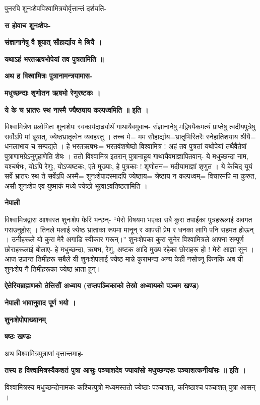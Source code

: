 \documentclass[11pt, a5paper]{article}
\begin{document}
पुनरपि शुनःशेपविश्वामित्रयोर्वृत्तान्तं दर्शयति-

\textbf{स होवाच शुनःशेपः-}

\textbf{संज्ञानानेषु वै ब्रूयात् सौहार्द्याय मे श्रियै ।}

\textbf{यथाऽहं भरतऋषभोपेयां तव पुत्रतामिति ॥}

\textbf{अथ ह विश्वामित्रः पुत्रानामन्त्रयामास-}

\textbf{मधुच्छन्दाः शृणोतन ऋषभो रेणुरष्टकः ।}

\textbf{ये के च भ्रातरः स्थ नास्मै ज्यैष्ठ्याय कल्पध्वमिति ॥ इति ।}

विश्वामित्रेण प्रलोभितः शुनःशेपः स्वकार्यदार्ढ्यार्थं गाथायैवमुवाच- संज्ञानानेषु मद्विषयैकमत्यं प्राप्तेषु त्वदीयपुत्रेषु सर्वोऽपि मां ब्रूयात्, ज्येष्ठभ्रातृत्वेन व्यवहरतु । तच्च मे= मम सौहार्द्याय=भ्रातृभिरितरैः स्नेहातिशयाय श्रीयै= धनलाभाय च सम्पद्यते । हे भरतऋषभः‍= भरतवंशश्रेष्ठो विश्वामित्र ! अहं तव पुत्रतां यथोपेयां तथैवैतेषां पुत्राणामग्रेऽनुगृहाणेति शेषः । ततो विश्वामित्र इतरान् पुत्रानाहूय गाथायैवमाज्ञापितवान्- ये मधुच्छन्दा नाम, यश्चर्षभः, योऽपि रेणुः, योऽप्यष्टकः, एते मुख्याः, हे पुत्रकाः ! शृणोतन= मदीयामाज्ञां शृणुत । ये केचिद् यूयं सर्वे भ्रातरः स्थ ते सर्वेऽपि अस्मै= शुनःशेपादस्मादपि ज्येष्ठाय= श्रेष्ठाय न कल्पध्वम्= विचारमपि मा कुरुत, असौ शुनःशेप एव युष्माकं मध्ये ज्येष्ठो भूत्वाऽवतिष्ठतामिति ।

\textbf{नेपाली}

विश्वामित्रद्वारा आश्वस्त शुनःशेप फेरि भन्छन्- “मेरो विषयमा भएका सबै कुरा तपाईंका पुत्रहरूलाई अवगत गराउनुहोस् । तिनले मलाई ज्येष्ठ भ्राताका रूपमा मानून् र आपसी प्रेम र धनका लागि पनि सहमत होऊन् । उनीहरूले यो कुरा मेरै अगाडि स्वीकार गरून्।”  शुनःशेपका कुरा सुनेर विश्वामित्रले आफ्ना सम्पूर्ण छोराहरूलाई बोलाए- हे मधुच्छन्दा, ऋषभ, रेणु, अष्टक आदि मुख्य रहेका छोराहरू हो ! मेरो आज्ञा सुन । आज उप्रान्त तिमीहरू सबैले यी शुनःशेपलाई ज्येष्ठ मान्ने कुराभन्दा अन्य केही नसोच्नू किनकि अब यी शुनःशेप नै तिमीहरूका ज्येष्ठ भ्राता हुन्।

\textbf{ऐतेरियब्राह्मणको  तेत्तिसौं अध्याय (सप्तपञ्चिकाको तेस्रो अध्यायको पञ्चम खण्ड)}

\textbf{नेपाली भावानुवाद पूर्ण भयो ।}

\textbf{शुनःशेपोपाख्यानम्}

\textbf{षष्ठः खण्डः}

अथ विश्वामित्रपुत्राणां वृत्तान्तमाह-

\textbf{तस्य ह विश्वामित्रस्यैकशतं पुत्रा आसुः पञ्चाशदेव ज्यायांसो मधुच्छन्दसः पञ्चाशत्कनीयांसः ॥ इति ।}

विश्वामित्रस्य मधुच्छन्दोनामकः कश्चित्पुत्रो मध्यमस्ततो ज्येष्ठाः पञ्चाशत्, कनिष्ठाश्च पञ्चाशत् पुत्रा आसन् ।
\end{document}
